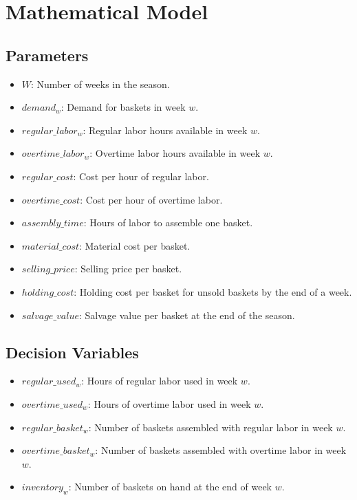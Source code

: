 \documentclass{article}
\begin{document}
\section*{Mathematical Model}

\subsection*{Parameters}
\begin{itemize}
    \item $W$: Number of weeks in the season.
    \item $demand_{w}$: Demand for baskets in week $w$.
    \item $regular\_labor_{w}$: Regular labor hours available in week $w$.
    \item $overtime\_labor_{w}$: Overtime labor hours available in week $w$.
    \item $regular\_cost$: Cost per hour of regular labor.
    \item $overtime\_cost$: Cost per hour of overtime labor.
    \item $assembly\_time$: Hours of labor to assemble one basket.
    \item $material\_cost$: Material cost per basket.
    \item $selling\_price$: Selling price per basket.
    \item $holding\_cost$: Holding cost per basket for unsold baskets by the end of a week.
    \item $salvage\_value$: Salvage value per basket at the end of the season.
\end{itemize}

\subsection*{Decision Variables}
\begin{itemize}
    \item $regular\_used_{w}$: Hours of regular labor used in week $w$.
    \item $overtime\_used_{w}$: Hours of overtime labor used in week $w$.
    \item $regular\_basket_{w}$: Number of baskets assembled with regular labor in week $w$.
    \item $overtime\_basket_{w}$: Number of baskets assembled with overtime labor in week $w$.
    \item $inventory_{w}$: Number of baskets on hand at the end of week $w$.
\end{itemize}
\end{document}
